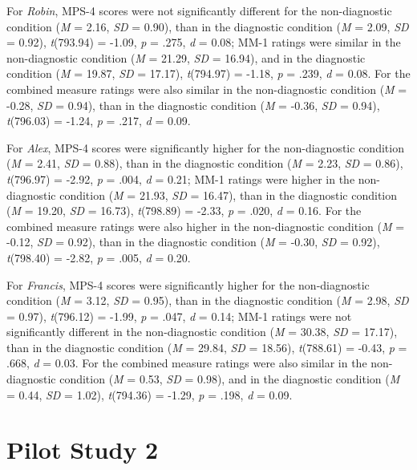 \documentclass[
  american,
  man,mask,floatsintext]{apa6}
\begin{document}
For \emph{Robin}, MPS-4 scores were not significantly different for the non-diagnostic condition (\emph{M} = 2.16, \emph{SD} = 0.90), than in the diagnostic condition (\emph{M} = 2.09, \emph{SD} = 0.92), \emph{t}(793.94) = -1.09, \emph{p} = .275, \emph{d} = 0.08; MM-1 ratings were similar in the non-diagnostic condition (\emph{M} = 21.29, \emph{SD} = 16.94), and in the diagnostic condition (\emph{M} = 19.87, \emph{SD} = 17.17), \emph{t}(794.97) = -1.18, \emph{p} = .239, \emph{d} = 0.08. For the combined measure ratings were also similar in the non-diagnostic condition (\emph{M} = -0.28, \emph{SD} = 0.94), than in the diagnostic condition (\emph{M} = -0.36, \emph{SD} = 0.94), \emph{t}(796.03) = -1.24, \emph{p} = .217, \emph{d} = 0.09.

For \emph{Alex}, MPS-4 scores were significantly higher for the non-diagnostic condition (\emph{M} = 2.41, \emph{SD} = 0.88), than in the diagnostic condition (\emph{M} = 2.23, \emph{SD} = 0.86), \emph{t}(796.97) = -2.92, \emph{p} = .004, \emph{d} = 0.21; MM-1 ratings were higher in the non-diagnostic condition (\emph{M} = 21.93, \emph{SD} = 16.47), than in the diagnostic condition (\emph{M} = 19.20, \emph{SD} = 16.73), \emph{t}(798.89) = -2.33, \emph{p} = .020, \emph{d} = 0.16. For the combined measure ratings were also higher in the non-diagnostic condition (\emph{M} = -0.12, \emph{SD} = 0.92), than in the diagnostic condition (\emph{M} = -0.30, \emph{SD} = 0.92), \emph{t}(798.40) = -2.82, \emph{p} = .005, \emph{d} = 0.20.

For \emph{Francis}, MPS-4 scores were significantly higher for the non-diagnostic condition (\emph{M} = 3.12, \emph{SD} = 0.95), than in the diagnostic condition (\emph{M} = 2.98, \emph{SD} = 0.97), \emph{t}(796.12) = -1.99, \emph{p} = .047, \emph{d} = 0.14; MM-1 ratings were not significantly different in the non-diagnostic condition (\emph{M} = 30.38, \emph{SD} = 17.17), than in the diagnostic condition (\emph{M} = 29.84, \emph{SD} = 18.56), \emph{t}(788.61) = -0.43, \emph{p} = .668, \emph{d} = 0.03. For the combined measure ratings were also similar in the non-diagnostic condition (\emph{M} = 0.53, \emph{SD} = 0.98), and in the diagnostic condition (\emph{M} = 0.44, \emph{SD} = 1.02), \emph{t}(794.36) = -1.29, \emph{p} = .198, \emph{d} = 0.09.

\newpage

\hypertarget{pilot-study-2}{%
\section{Pilot Study 2}\label{pilot-study-2}}
\end{document}
